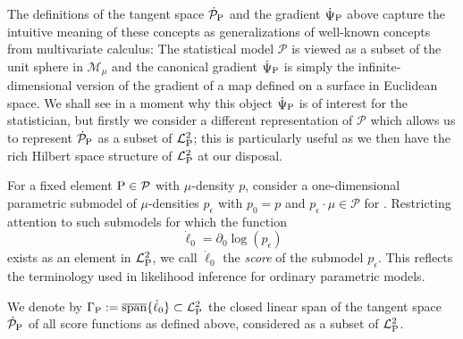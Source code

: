 \documentclass[a4,danish]{article}
\DeclareMathOperator{\TT}{\Psi}
\newcommand{\lp}{\mathcal{L}_{\P}^2} %
\begin{document}

The definitions of the tangent space $\dot{\mathcal{P}}_{\P}$ and the gradient $\dot{\TT}_{\P}$
above capture the intuitive meaning of these concepts as generalizations of well-known concepts from
multivariate calculus: The statistical model $\mathcal{P}$ is viewed as a subset of the unit sphere
in $\mathcal{M}_{\mu}$ and the canonical gradient $\dot{\TT}_{\P}$ is simply the
infinite-dimensional version of the gradient of a map defined on a surface in Euclidean space. We
shall see in a moment why this object $\dot{\TT}_{\P}$ is of interest for the statistician, but
firstly we consider a different representation of $\mathcal{P}$ which allows us to represent
$\dot{\mathcal{P}}_{\P}$ as a subset of $\lp$; this is particularly useful as we then
have the rich Hilbert space structure of $\lp$ at our disposal.

For a fixed element $\P \in \mathcal{P}$ with $\mu$-density $p$, consider a one-dimensional
parametric submodel of $\mu$-densities $p_{\epsilon}$ with $p_0=p$ and
$p_{\epsilon} \cdot \mu \in \mathcal{P}$ for . Restricting
attention to such submodels for which the function
\begin{equation*}
  \dot{\ell}_0 = \partial_0 \log(p_{\epsilon})
\end{equation*}
exists as an element in $\lp$, we call $\dot{\ell}_0$ the
\textit{score} of the submodel $p_{\epsilon}$. This reflects the
terminology used in likelihood inference for ordinary parametric
models.

\begin{proposition}
  \label{prop:repr-tang-spac}
  We denote by
  $\Gamma_{\P} := \overline{\mathrm{span}}\{\dot{\ell}_0\} \subset
  \lp$ the closed linear span of the tangent space
  $\dot{\mathcal{P}}_{\P}$ of all score functions as defined above,
  considered as a subset of $\lp$.
\end{proposition}
\end{document}
